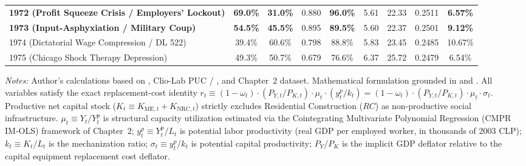 \begin{table}[htbp]
{\begin{tabular}{lcccccccc}
\textbf{1972 (Profit Squeeze Crisis / Employers' Lockout)} & \textbf{69.0\%} & \textbf{31.0\%} & 0.880 & \textbf{96.0\%} & 5.61 & 22.33 & 0.2511 & \textbf{6.57\%} \\
\textbf{1973 (Input-Asphyxiation / Military Coup)} & \textbf{54.5\%} & \textbf{45.5\%} & 0.895 & \textbf{89.5\%} & 5.60 & 22.37 & 0.2501 & \textbf{9.12\%} \\
1974 (Dictatorial Wage Compression / DL 522) & 39.4\% & 60.6\% & 0.798 & 88.8\% & 5.83 & 23.45 & 0.2485 & 10.67\% \\
1975 (Chicago Shock Therapy Depression) & 49.3\% & 50.7\% & 0.679 & 76.6\% & 6.37 & 25.72 & 0.2479 & 6.54\% \\
\bottomrule
\end{tabular}%
}
\begin{minipage}{0.98\textwidth}
\vspace{0.4em}
\footnotesize
\textit{Notes:} Author's calculations based on \citet{Astorga2023}, Clio-Lab PUC / \citet{DiazLudersWagner2016}, and Chapter~2 dataset. Mathematical formulation grounded in \citet[Section 6.1, Eqs.~28--31]{Basu2017} and \citet{Weisskopf1978,Weisskopf1979}. All variables satisfy the exact replacement-cost identity $r_t \equiv (1 - \omega_t) \cdot (P_{Y, t} / P_{K, t}) \cdot \mu_t \cdot (y^p_t / k_t) = (1 - \omega_t) \cdot (P_{Y, t} / P_{K, t}) \cdot \mu_t \cdot \sigma_t$. Productive net capital stock ($K_t \equiv K_{\text{ME}, t} + K_{\text{NRC}, t}$) strictly excludes Residential Construction ($RC$) as non-productive social infrastructure. $\mu_t \equiv Y_t / Y^p_t$ is structural capacity utilization estimated via the Cointegrating Multivariate Polynomial Regression (CMPR IM-OLS) framework of Chapter~2; $y^p_t \equiv Y^p_t / L_t$ is potential labor productivity (real GDP per employed worker, in thousands of 2003 CLP); $k_t \equiv K_t / L_t$ is the mechanization ratio; $\sigma_t \equiv y^p_t / k_t$ is potential capital productivity; $P_Y / P_K$ is the implicit GDP deflator relative to the capital equipment replacement cost deflator.
\end{minipage}
\end{table}
